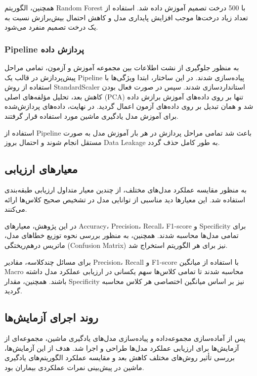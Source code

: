 همچنین، الگوریتم Random Forest با 500 درخت تصمیم آموزش داده شد. استفاده از تعداد زیاد درخت‌ها موجب افزایش پایداری مدل و کاهش احتمال بیش‌برازش نسبت به یک درخت تصمیم منفرد می‌شود.



\subsubsection{Pipeline پردازش داده}

به منظور جلوگیری از نشت اطلاعات بین مجموعه آموزش و آزمون، تمامی مراحل پیش‌پردازش در قالب یک Pipeline پیاده‌سازی شدند. در این ساختار، ابتدا ویژگی‌ها با استفاده از روش StandardScaler استانداردسازی شدند. سپس در صورت فعال بودن کاهش بعد، تحلیل مؤلفه‌های اصلی (PCA) تنها بر روی داده‌های آموزش برازش داده شد و همان تبدیل بر روی داده‌های آزمون اعمال گردید. در نهایت، داده‌های پردازش‌شده برای آموزش مدل یادگیری ماشین مورد استفاده قرار گرفتند.

استفاده از Pipeline باعث شد تمامی مراحل پردازش در هر بار آموزش مدل به صورت مستقل انجام شوند و احتمال بروز Data Leakage به طور کامل حذف گردد.



\subsection{معیارهای ارزیابی}

به منظور مقایسه عملکرد مدل‌های مختلف، از چندین معیار متداول ارزیابی طبقه‌بندی استفاده شد. این معیارها دید مناسبی از توانایی مدل در تشخیص صحیح کلاس‌ها ارائه می‌کنند.

در این پژوهش، معیارهای Accuracy، Precision، Recall، F1-score و Specificity برای تمامی مدل‌ها محاسبه شدند. همچنین، به منظور بررسی نحوه توزیع خطاهای مدل، ماتریس درهم‌ریختگی (Confusion Matrix) نیز برای هر الگوریتم استخراج شد.

برای مسائل چندکلاسه، مقادیر Precision، Recall و F1-score با استفاده از میانگین Macro محاسبه شدند تا تمامی کلاس‌ها سهم یکسانی در ارزیابی عملکرد مدل داشته باشند. همچنین، مقدار Specificity نیز بر اساس میانگین اختصاصی هر کلاس محاسبه گردید.


\subsection{روند اجرای آزمایش‌ها}

پس از آماده‌سازی مجموعه‌داده و پیاده‌سازی مدل‌های یادگیری ماشین، مجموعه‌ای از آزمایش‌ها برای ارزیابی عملکرد مدل‌ها طراحی و اجرا شد. هدف از این آزمایش‌ها، بررسی تأثیر روش‌های مختلف کاهش بعد و مقایسه عملکرد الگوریتم‌های یادگیری ماشین در پیش‌بینی نمرات عملکردی بیماران بود.

